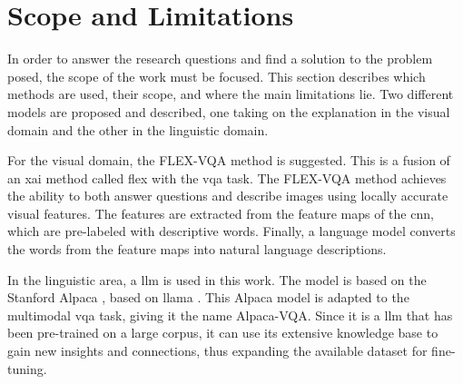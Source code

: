 \label{sec:1_3_scope_and_limitations}

\begin{comment}
Here you can tell the reader about the scope of your thesis, kind of meaning describing what you have done in slighter more detail. The question in section 1.2 might be of the general type, but are you using any specific case studies/application scenarios? Are you limited to a specific type of platform? Have you performed experiments in special environments only, etc.? Describe such information here so that the reader does not expect something going beyond this.
\end{comment}

\section{Scope and Limitations}


    In order to answer the research questions and find a solution to the problem posed, the scope of the work must be focused. This section describes which methods are used, their scope, and where the main limitations lie. Two different models are proposed and described, one taking on the explanation in the visual domain and the other in the linguistic domain.

    For the visual domain, the FLEX-VQA method is suggested. This is a fusion of an \gls{xai} method called \gls{flex} \cite{wickramanayakeFLEXFaithfulLinguistic2019} with the \gls{vqa} task. The FLEX-VQA method achieves the ability to both answer questions and describe images using locally accurate visual features. The features are extracted from the feature maps of the \gls{cnn}, which are pre-labeled with descriptive words. Finally, a language model converts the words from the feature maps into natural language descriptions.

    In the linguistic area, a \gls{llm} is used in this work. The model is based on the Stanford Alpaca \cite{taoriStanfordCRFM, taoriStanfordAlpacaInstructionfollowing2023}, based on \gls{llama} \cite{touvronLLaMAOpenEfficient2023}. This Alpaca model is adapted to the multimodal \gls{vqa} task, giving it the name Alpaca-VQA. Since it is a \gls{llm} that has been pre-trained on a large corpus, it can use its extensive knowledge base to gain new insights and connections, thus expanding the available dataset for fine-tuning. 


